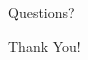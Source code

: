 \documentclass[aspectratio=169,12pt]{beamer}
\begin{document}
\begin{frame}
    \begin{center}
    \Huge Questions?
    
    \vspace{1cm}
    \Large Thank You!
    \end{center}
\end{frame}
\end{document}
